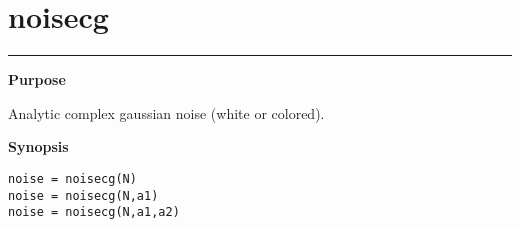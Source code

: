 

\section*{\hspace*{-1.6cm} noisecg}

\vspace*{-.4cm}
\hspace*{-1.6cm}\rule[0in]{16.5cm}{.02cm}
\vspace*{.2cm}



{\bf \large \sf Purpose}\\
\hspace*{1.5cm}
\begin{minipage}[t]{13.5cm}
Analytic complex gaussian noise (white or colored).
\end{minipage}
\vspace*{.5cm}


{\bf \large \sf Synopsis}\\
\hspace*{1.5cm}
\begin{minipage}[t]{13.5cm}
\begin{verbatim}
noise = noisecg(N)
noise = noisecg(N,a1)
noise = noisecg(N,a1,a2)
\end{verbatim}
\end{minipage}
\vspace*{.5cm}


